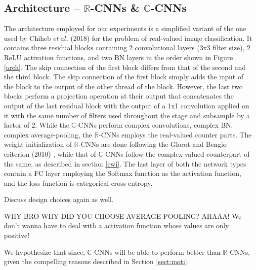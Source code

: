  
 \subsection{Architecture -- $\mathbb{R}$-CNNs \& $\mathbb{C}$-CNNs}
 The architecture employed for our experiments is a simplified variant of the one used by Chiheb $et \ al.$ (2018) \cite{trabelsi2018deep} for the problem of real-valued image classification. It contains three residual blocks containing 2 convolutional layers (3x3 filter size), 2 ReLU activation functions, and two BN layers in the order shown in Figure \ref{arch}. The skip connection of the first block differs from that of the second and the third block. The skip connection of the first block simply adds the input of the block to the output of the other thread of the block. However, the last two blocks perform a projection operation at their output that concatenates the output of the last residual block with the output of a 1x1 convolution applied on it with the same number of filters used throughout the stage and subsample by a factor of 2. While the $\mathbb{C}$-CNNs perform complex convolutions, complex BN, complex average-pooling, the $\mathbb{R}$-CNNs employs the real-valued counter parts. The weight initialization of $\mathbb{R}$-CNNs are done following the Glorot and Bengio criterion (2010) \cite{glorot2010understanding}, while that of $\mathbb{C}$-CNNs follow the complex-valued counterpart of the same, as described in section \ref{cwi}. The last layer of both the network types contain a FC layer employing the Softmax function as the activation function, and the loss function is categorical-cross entropy.
 
 Discuss design choices again as well.
 
  WHY BRO WHY DID YOU CHOOSE AVERAGE POOLING?
 AHAAA!  We don't wanna have to deal with a activation function whose values are only positive!
 
 
 
 
 
 We hypothesize that since, $\mathbb{C}$-CNNs will be able to perform better than $\mathbb{R}$-CNNs, given the compelling reasons described in Section \ref{sect:moti}.
 
 
 
 
 